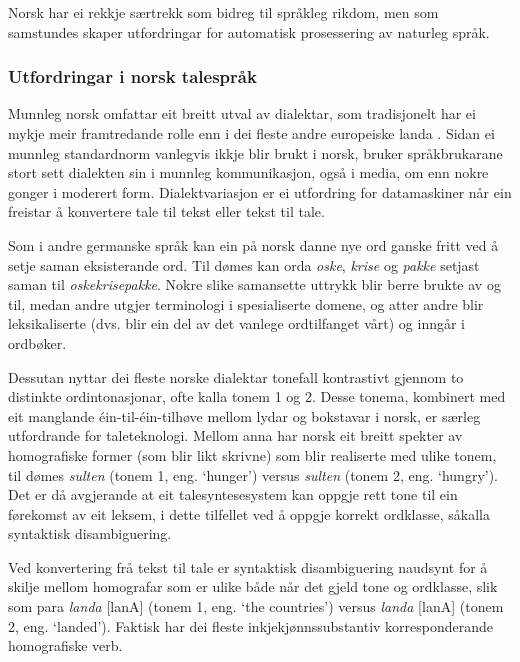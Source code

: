 \begin{multicols}{2}
Norsk har ei rekkje særtrekk som bidreg til språkleg rikdom, men som samstundes skaper utfordringar for automatisk prosessering av naturleg språk.

\subsubsection{Utfordringar i norsk talespråk}
Munnleg norsk omfattar eit breitt utval av dialektar, som tradisjonelt har ei mykje meir framtredande rolle enn i dei fleste andre europeiske landa \cite{stm35:2008}.
Sidan ei munnleg standardnorm vanlegvis ikkje blir brukt i norsk, bruker språkbrukarane stort sett dialekten sin i munnleg kommunikasjon, også i media, om enn nokre gonger i moderert form. 
Dialektvariasjon er ei utfordring for datamaskiner når ein freistar å konvertere tale til tekst eller tekst til tale.


Som i andre germanske språk kan ein på norsk danne nye ord ganske fritt ved å setje saman eksisterande ord. Til dømes kan orda \textit{oske}, \textit{krise} og \textit{pakke} setjast saman til \textit{oskekrisepakke}.
Nokre slike samansette uttrykk blir berre brukte av og til, medan andre utgjer terminologi i spesialiserte domene, og atter andre blir leksikaliserte (dvs. blir ein del av det vanlege ordtilfanget vårt) og inngår i ordbøker. 

Dessutan nyttar dei fleste norske dialektar tonefall kontrastivt gjennom to distinkte ordintonasjonar, ofte kalla tonem 1 og 2. Desse tonema, kombinert med eit manglande éin-til-éin-tilhøve mellom lydar og bokstavar i norsk, er særleg utfordrande for taleteknologi. Mellom anna har norsk eit breitt spekter av homografiske former (som blir likt skrivne) som blir realiserte med ulike tonem, til dømes  \textit{sulten} (tonem 1, eng. `hunger') versus \textit{sulten} (tonem 2, eng. `hungry'). Det er då avgjerande at eit talesyntesesystem kan oppgje rett tone til ein førekomst av eit leksem, i dette tilfellet ved å oppgje korrekt ordklasse, såkalla syntaktisk disambiguering. 

Ved konvertering frå tekst til tale er syntaktisk disambiguering naudsynt for å skilje mellom homografar som er ulike både når det gjeld tone og ordklasse, slik som para \textit{landa} {[}lanA{]} (tonem 1, eng. `the countries') versus \textit{landa} {[}lanA{]} (tonem 2, eng. `landed'). 
Faktisk har dei fleste inkjekjønnssubstantiv korresponderande homografiske verb. 


\end{multicols}
